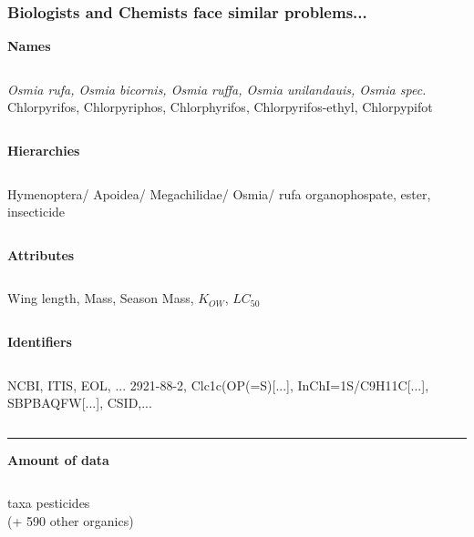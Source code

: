 \documentclass[12pt
, t
]{beamer}
\begin{document}
\begin{frame}
\frametitle{Biologists and Chemists face similar problems...}
\footnotesize

\centering
\textbf{\textcolor{hilight}{Names}}
\begin{columns}[t]
\emph{Osmia rufa, Osmia bicornis, Osmia ruffa, Osmia unilandauis, Osmia spec.} 
Chlorpyrifos, Chlorpyriphos, Chlorphyrifos, Chlorpyrifos-ethyl, Chlorpypifot
\end{columns}
\pause


\centering
\textbf{\textcolor{hilight}{Hierarchies}}
\begin{columns}[t]
Hymenoptera/ Apoidea/ Megachilidae/ Osmia/ rufa 
organophospate, ester, insecticide
\end{columns}
\pause

\centering
\textbf{\textcolor{hilight}{Attributes}}
\begin{columns}[t]
Wing length, Mass, Season 
Mass, $K_{OW}$, $LC_{50}$
\end{columns}
\pause

\centering
\textbf{\textcolor{hilight}{Identifiers}}
\begin{columns}[t]
NCBI, ITIS, EOL, ... 
2921-88-2, Clc1c(OP(=S)[...], InChI=1S/C9H11C[...], SBPBAQFW[...], CSID,...
\end{columns}
\vspace{0.8em}
\pause

\rule{\textwidth}{1pt}
\textbf{\textcolor{hilight}{Amount of data}}

\begin{columns}[t]
 taxa
 pesticides \\ (+ 590 other organics)
\end{columns}
\end{frame}
\end{document}
